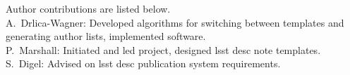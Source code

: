 Author contributions are listed below. \\
A.~Drlica-Wagner: Developed algorithms for switching between templates and generating author lists, implemented software. \\
P.~Marshall: Initiated and led project, designed lsst desc note templates. \\
S.~Digel: Advised on lsst desc publication system requirements. \\
